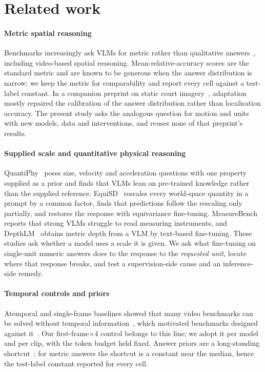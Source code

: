 \documentclass[preprint,number]{elsarticle}
\begin{document}
\section{Related work}
\label{sec:related}

\paragraph{Metric spatial reasoning}
Benchmarks increasingly ask VLMs for metric rather than qualitative
answers~\cite{vsibench2024,spatialvlm2024,spatialrgpt2024,qspatialbench2024},
including video-based spatial reasoning. Mean-relative-accuracy scores are the
standard metric and are known to be generous when the answer distribution is
narrow; we keep the metric for comparability and report every cell against a
test-label constant. In a companion preprint on static court
imagery~\cite{ji2026calibration}, adaptation mostly repaired the calibration of
the answer distribution rather than localisation accuracy. The present study
asks the analogous question for motion and units with new models, data and
interventions, and reuses none of that preprint's results.

\paragraph{Supplied scale and quantitative physical reasoning}
QuantiPhy~\cite{quantiphy2025} poses size, velocity and acceleration questions
with one property supplied as a prior and finds that VLMs lean on pre-trained
knowledge rather than the supplied reference. EquiSD~\cite{equisd2026}
rescales every world-space quantity in a prompt by a common factor, finds that
predictions follow the rescaling only partially, and restores the response with
equivariance fine-tuning. MeasureBench~\cite{measurebench2025} reports that
strong VLMs struggle to read measuring instruments, and
DepthLM~\cite{depthlm2025} obtains metric depth from a VLM by text-based
fine-tuning. These studies ask whether a model uses a scale it is given. We ask
what fine-tuning on single-unit numeric answers does to the response to the
\emph{requested unit}, locate where that response breaks, and test a
supervision-side cause and an inference-side remedy.

\paragraph{Temporal controls and priors}
Atemporal and single-frame baselines showed that many video benchmarks can be
solved without temporal information~\cite{atp2022,singleframebias2023}, which
motivated benchmarks designed against it~\cite{mvbench2024,tempcompass2024}. Our
first-frame$\times4$ control belongs to this line; we adopt it per model and per
clip, with the token budget held fixed. Answer priors are a long-standing
shortcut~\cite{vqav2_2017}; for metric answers the shortcut is a constant near
the median, hence the test-label constant reported for every cell.
\end{document}
